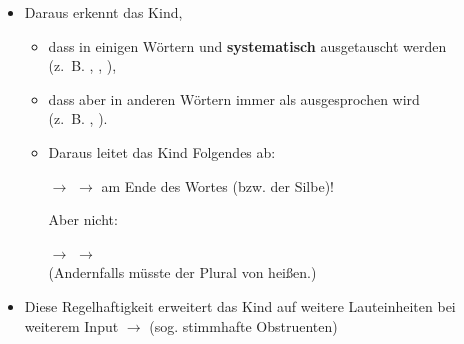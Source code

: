 \begin{frame}
		
\begin{itemize}
	\item Daraus erkennt das Kind,
	
	\begin{itemize}
		\item dass in einigen Wörtern \textipa{[d]} und \textipa{[t]} \textbf{systematisch} ausgetauscht werden \\(z.~B. , , ),
		\item dass aber in anderen Wörtern \textipa{[t]} immer als \textipa{[t]} ausgesprochen wird  \\(z.~B. , ).
		\item[]
		\item Daraus leitet das Kind Folgendes ab:
		\item[$\rightarrow$]  $\rightarrow$ \textipa{[t]} am Ende des Wortes (bzw. der Silbe)!
		\item[]
		\item[] Aber nicht:
		\item[]
		\item[$\rightarrow$]  $\rightarrow$ \textipa{[d]}\\ (Andernfalls müsste der Plural von   heißen.)
	\end{itemize}
	
	\item[]
	\item Diese Regelhaftigkeit erweitert das Kind auf weitere Lauteinheiten bei weiterem Input $\rightarrow$ 	(sog. stimmhafte Obstruenten)
\end{itemize}

\end{frame}
	

